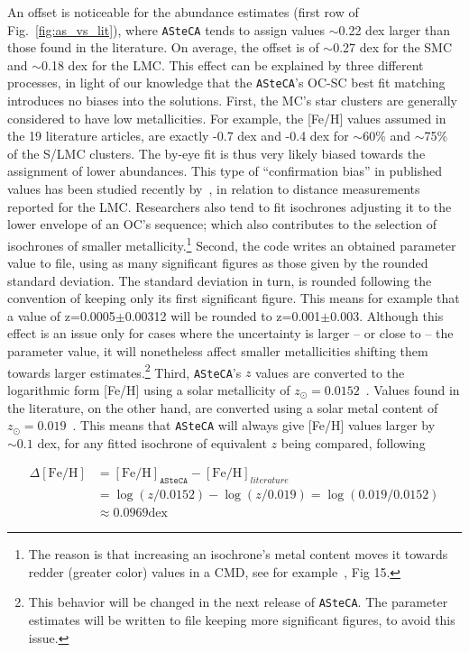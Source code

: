 \documentclass{aa}
\begin{document}
An offset is noticeable for the abundance estimates (first row of
Fig.~\ref{fig:as_vs_lit}), where \texttt{ASteCA} tends to assign values
$\sim$0.22 dex larger than those found in the literature.
On average, the offset is of $\sim$0.27 dex for the SMC and $\sim$0.18 dex for
the LMC.\@
%
This effect can be explained by three different processes, in light of our
knowledge that the \texttt{ASteCA}'s OC-SC best fit matching introduces no
biases into the solutions.
%
First, the MC's star clusters are generally considered to have low
metallicities. For example, the [Fe/H] values assumed in the 19
literature articles, are exactly -0.7 dex and -0.4 dex for $\sim$60\% and
$\sim$75\% of the S/LMC clusters. The by-eye fit is thus very likely biased
towards the assignment of lower abundances. This type of ``confirmation
bias'' in published values has been studied recently by~\cite{de_Grijs_2014}, in
relation to distance measurements reported for the LMC.\@
Researchers also tend to fit isochrones adjusting it to the lower envelope of an
OC's sequence; which also contributes to the selection of isochrones of
smaller metallicity.\footnote{The reason is that increasing an isochrone's metal
content moves it towards redder (greater color) values in a CMD, see for
example~\cite{Bressan_2012}, Fig 15.}
%
Second, the code writes an obtained parameter value to file, using as many
significant figures as those given by the rounded standard deviation.
The standard deviation in turn, is rounded following the convention of keeping
only its first significant figure. This means for example that a value of
z=0.0005$\pm$0.00312 will be rounded to z=0.001$\pm$0.003. Although this effect
is an issue only for cases where the uncertainty is larger -- or close to -- the
parameter value, it will nonetheless affect smaller metallicities shifting
them towards larger estimates.\footnote{This behavior will be changed in the
next release of \texttt{ASteCA}. The parameter estimates will be written to
file keeping more significant figures, to avoid this issue.}
%
Third, \texttt{ASteCA}'s $z$ values are converted to the logarithmic form [Fe/H]
using a solar metallicity of $z_{\odot}{=}0.0152$~\citep{Bressan_2012}.
Values found in the literature, on the other hand, are converted using a solar
metal content of $z_{\odot}{=}0.019$~\citep{Marigo_2008}. This means that
\texttt{ASteCA} will always give [Fe/H] values larger by ${\sim}0.1$ dex, for
any fitted isochrone of equivalent $z$ being compared, following

\begin{equation}
\begin{split}
\Delta\mathrm{[Fe/H]} & = \mathrm{[Fe/H]}_{\mathtt{ASteCA}} -
\mathrm{[Fe/H]}_{literature} \\
& = \log(z/0.0152) - \log(z/0.019) = \log(0.019/0.0152) \\
& \approx 0.0969 \mathrm{dex}
\end{split}
\label{eq:delta_feh}
\end{equation}
\end{document}
